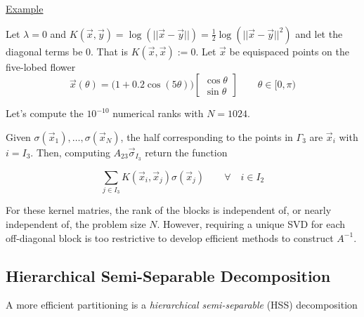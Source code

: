 \begin{center}
    
\end{center}

\underline{Example}

Let $\lambda=0$ and $K(\vec{x}, \vec{y})=\log(||\vec{x} - \vec{y}||)=\frac{1}{2}\log(||\vec{x} - \vec{y}||^2)$
and let the diagonal terms be 0. That is $K(\vec{x}, \vec{x}):= 0$. Let $\vec{x}$ be equispaced points on the five-lobed flower
\begin{equation*}
    \vec{x}(\theta) = \big(1 + 0.2 \cos (5 \theta)\big)
    \begin{bmatrix}
        \cos \theta \\
        \sin \theta
    \end{bmatrix}
    \qquad \theta \in [0, \pi)
\end{equation*}

Let's compute the $10^{-10}$ numerical ranks with $N=1024$.



\begin{center}
    
\end{center}

\begin{center}
    
\end{center}

Given $\sigma(\vec{x}_1), \ldots, \sigma(\vec{x}_N)$, the half corresponding to the points in $\Gamma_3$ are $\vec{x}_i$ with $i=I_3$. Then, computing $A_{23}\vec{\sigma}_{I_3}$ return the function

\begin{equation*}
    \sum_{j\in I_3} K(\vec{x}_i, \vec{x}_j)\sigma(\vec{x}_j) \qquad  \forall \quad i \in I_2
\end{equation*}

For these kernel matries, the rank of the blocks is independent of, or nearly independent of, the problem size $N$. However, requiring a unique SVD for each off-diagonal block is too restrictive to develop efficient methods to construct $A^{-1}$. 

\subsection{Hierarchical Semi-Separable Decomposition}

A more efficient partitioning is a \emph{hierarchical semi-separable} (HSS) decomposition

